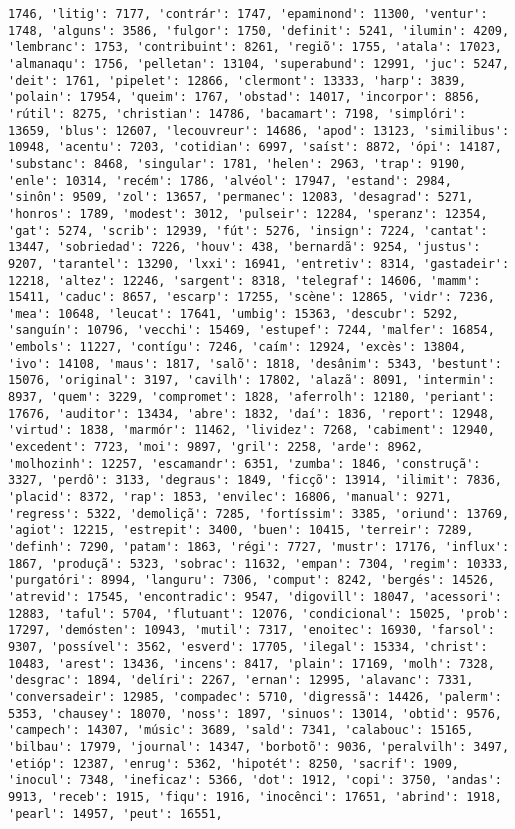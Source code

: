 \documentclass[11pt]{article}
\begin{document}
\begin{Verbatim}[commandchars=\\\{\}]
1746, 'litig': 7177, 'contrár': 1747, 'epaminond': 11300, 'ventur': 1748, 'alguns': 3586, 'fulgor': 1750, 'definit': 5241, 'ilumin': 4209, 'lembranc': 1753, 'contribuint': 8261, 'regiõ': 1755, 'atala': 17023, 'almanaqu': 1756, 'pelletan': 13104, 'superabund': 12991, 'juc': 5247, 'deit': 1761, 'pipelet': 12866, 'clermont': 13333, 'harp': 3839, 'polain': 17954, 'queim': 1767, 'obstad': 14017, 'incorpor': 8856, 'rútil': 8275, 'christian': 14786, 'bacamart': 7198, 'simplóri': 13659, 'blus': 12607, 'lecouvreur': 14686, 'apod': 13123, 'similibus': 10948, 'acentu': 7203, 'cotidian': 6997, 'saíst': 8872, 'ópi': 14187, 'substanc': 8468, 'singular': 1781, 'helen': 2963, 'trap': 9190, 'enle': 10314, 'recém': 1786, 'alvéol': 17947, 'estand': 2984, 'sinôn': 9509, 'zol': 13657, 'permanec': 12083, 'desagrad': 5271, 'honros': 1789, 'modest': 3012, 'pulseir': 12284, 'speranz': 12354, 'gat': 5274, 'scrib': 12939, 'fút': 5276, 'insign': 7224, 'cantat': 13447, 'sobriedad': 7226, 'houv': 438, 'bernardã': 9254, 'justus': 9207, 'tarantel': 13290, 'lxxi': 16941, 'entretiv': 8314, 'gastadeir': 12218, 'altez': 12246, 'sargent': 8318, 'telegraf': 14606, 'mamm': 15411, 'caduc': 8657, 'escarp': 17255, 'scène': 12865, 'vidr': 7236, 'mea': 10648, 'leucat': 17641, 'umbig': 15363, 'descubr': 5292, 'sanguín': 10796, 'vecchi': 15469, 'estupef': 7244, 'malfer': 16854, 'embols': 11227, 'contígu': 7246, 'caím': 12924, 'excès': 13804, 'ivo': 14108, 'maus': 1817, 'salõ': 1818, 'desânim': 5343, 'bestunt': 15076, 'original': 3197, 'cavilh': 17802, 'alazã': 8091, 'intermin': 8937, 'quem': 3229, 'compromet': 1828, 'aferrolh': 12180, 'periant': 17676, 'auditor': 13434, 'abre': 1832, 'daí': 1836, 'report': 12948, 'virtud': 1838, 'marmór': 11462, 'lividez': 7268, 'cabiment': 12940, 'excedent': 7723, 'moi': 9897, 'gril': 2258, 'arde': 8962, 'molhozinh': 12257, 'escamandr': 6351, 'zumba': 1846, 'construçã': 3327, 'perdô': 3133, 'degraus': 1849, 'ficçõ': 13914, 'ilimit': 7836, 'placid': 8372, 'rap': 1853, 'envilec': 16806, 'manual': 9271, 'regress': 5322, 'demoliçã': 7285, 'fortíssim': 3385, 'oriund': 13769, 'agiot': 12215, 'estrepit': 3400, 'buen': 10415, 'terreir': 7289, 'definh': 7290, 'patam': 1863, 'régi': 7727, 'mustr': 17176, 'influx': 1867, 'produçã': 5323, 'sobrac': 11632, 'empan': 7304, 'regim': 10333, 'purgatóri': 8994, 'languru': 7306, 'comput': 8242, 'bergés': 14526, 'atrevid': 17545, 'encontradic': 9547, 'digovill': 18047, 'acessori': 12883, 'taful': 5704, 'flutuant': 12076, 'condicional': 15025, 'prob': 17297, 'demósten': 10943, 'mutil': 7317, 'enoitec': 16930, 'farsol': 9307, 'possível': 3562, 'esverd': 17705, 'ilegal': 15334, 'christ': 10483, 'arest': 13436, 'incens': 8417, 'plain': 17169, 'molh': 7328, 'desgrac': 1894, 'delíri': 2267, 'ernan': 12995, 'alavanc': 7331, 'conversadeir': 12985, 'compadec': 5710, 'digressã': 14426, 'palerm': 5353, 'chausey': 18070, 'noss': 1897, 'sinuos': 13014, 'obtid': 9576, 'campech': 14307, 'músic': 3689, 'sald': 7341, 'calabouc': 15165, 'bilbau': 17979, 'journal': 14347, 'borbotõ': 9036, 'peralvilh': 3497, 'etióp': 12387, 'enrug': 5362, 'hipotét': 8250, 'sacrif': 1909, 'inocul': 7348, 'ineficaz': 5366, 'dot': 1912, 'copi': 3750, 'andas': 9913, 'receb': 1915, 'fiqu': 1916, 'inocênci': 17651, 'abrind': 1918, 'pearl': 14957, 'peut': 16551, 
\end{Verbatim}
\end{document}
